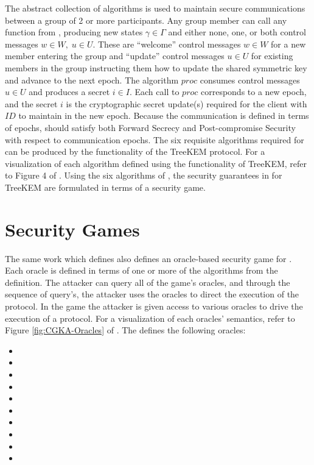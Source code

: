The abstract collection of algorithms \CGKAdef is used to maintain secure communications between a group of 2 or more participants.
Any group member can call any function from \CGKAdef, producing new states \(\gamma \in \Gamma\) and either none, one, or both control messages \(w \in W,\; u \in U\).
These are ``welcome'' control messages \(w \in W\) for a new member entering the group and ``update'' control messages \(u \in U\) for existing members in the group instructing them how to update the shared symmetric key and advance to the next epoch.
The algorithm \(proc\) consumes control messages \(u \in U\) and produces a secret \(i \in I\).
Each call to \(proc\) corresponds to a new epoch, and the secret \(i\) is the cryptographic secret update(s) required for the client with \(ID\) to maintain  in the new epoch.
Because the communication is defined in terms of epochs,  should satisfy both Forward Secrecy and Post-compromise Security with respect to communication epochs.
The six requisite algorithms required for \CGKAdef can be produced by the functionality of the TreeKEM protocol.
For a visualization of each \CGKAdef algorithm defined using the functionality of TreeKEM, refer to Figure 4 of \autocite{alwen2020security}.
Using the six algorithms of \CGKAdef, the security guarantees in for TreeKEM are formulated in terms of a security game.


\hypertarget{sec:security-games}{%
\section{Security Games}\label{sec:security-games}}

The same work which defines  also defines an oracle-based security game for .
Each oracle is defined in terms of one or more of the algorithms from the \CGKAdef definition.
The attacker can query all of the game's oracles, and through the sequence of query's, the attacker uses the oracles to direct the execution of the  protocol.
In the game the attacker is given access to various oracles to drive the execution of a  protocol.
For a visualization of each oracles' semantics, refer to Figure \ref{fig:CGKA-Oracles} of \autocite{alwen2020security}.
The \CGKAsec defines the following oracles:

\begin{itemize}
\item {}
\item {}
\item {}
\item {}
\item {}
\item {}
\item {}
\item {}
\item {}
\item {}
\end{itemize}

